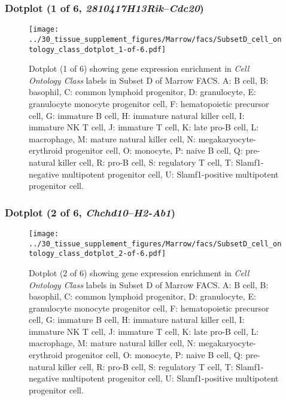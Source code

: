 \subsubsection{Dotplot (1 of 6, \emph{2810417H13Rik}--\emph{Cdc20})}
\begin{figure}[h]
\centering
\texttt{[image: ../30\_tissue\_supplement\_figures/Marrow/facs/SubsetD\_cell\_ontology\_class\_dotplot\_1-of-6.pdf]}

\caption{ Dotplot (1 of 6)  showing gene expression enrichment in \emph{Cell Ontology Class} labels in Subset D of Marrow FACS. A: B cell, B: basophil, C: common lymphoid progenitor, D: granulocyte, E: granulocyte monocyte progenitor cell, F: hematopoietic precursor cell, G: immature B cell, H: immature natural killer cell, I: immature NK T cell, J: immature T cell, K: late pro-B cell, L: macrophage, M: mature natural killer cell, N: megakaryocyte-erythroid progenitor cell, O: monocyte, P: naive B cell, Q: pre-natural killer cell, R: pro-B cell, S: regulatory T cell, T: Slamf1-negative multipotent progenitor cell, U: Slamf1-positive multipotent progenitor cell.}
\end{figure}


\clearpage

\subsubsection{Dotplot (2 of 6, \emph{Chchd10}--\emph{H2-Ab1})}
\begin{figure}[h]
\centering
\texttt{[image: ../30\_tissue\_supplement\_figures/Marrow/facs/SubsetD\_cell\_ontology\_class\_dotplot\_2-of-6.pdf]}

\caption{ Dotplot (2 of 6)  showing gene expression enrichment in \emph{Cell Ontology Class} labels in Subset D of Marrow FACS. A: B cell, B: basophil, C: common lymphoid progenitor, D: granulocyte, E: granulocyte monocyte progenitor cell, F: hematopoietic precursor cell, G: immature B cell, H: immature natural killer cell, I: immature NK T cell, J: immature T cell, K: late pro-B cell, L: macrophage, M: mature natural killer cell, N: megakaryocyte-erythroid progenitor cell, O: monocyte, P: naive B cell, Q: pre-natural killer cell, R: pro-B cell, S: regulatory T cell, T: Slamf1-negative multipotent progenitor cell, U: Slamf1-positive multipotent progenitor cell.}
\end{figure}


\clearpage

